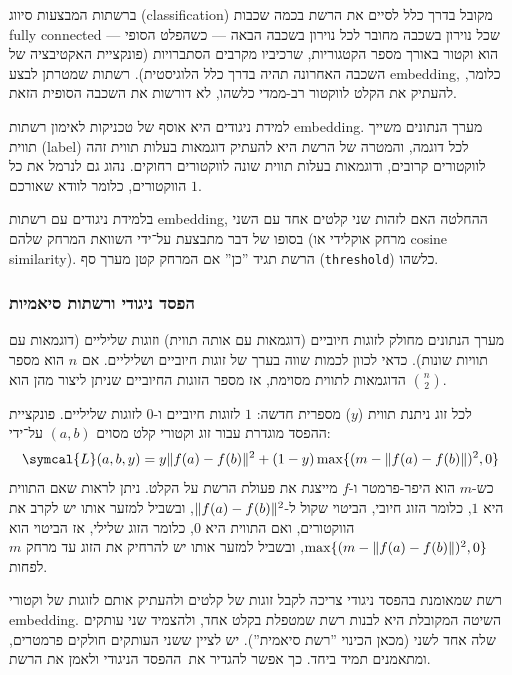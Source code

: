 \documentclass[hebrew, a4paper]{article}
\theoremstyle{plain}
\theoremstyle{definition}
\numberwithin{equation}{section}
\DeclarePairedDelimiter\norm{\lVert}{\rVert}
\DeclarePairedDelimiter\set{\{}{\}}
\begin{document}
ברשתות המבצעות סיווג (classification) מקובל בדרך כלל לסיים את הרשת
בכמה שכבות fully connected --- שכל נוירון בשכבה מחובר לכל נוירון בשכבה
הבאה --- כשהפלט הסופי הוא וקטור באורך מספר הקטגוריות, שרכיביו מקרבים
הסתברויות (פונקציית האקטיבציה של השכבה האחרונה תהיה בדרך כלל
הלוגיסטית). רשתות שמטרתן לבצע embedding, כלומר, להעתיק את הקלט לווקטור
רב-ממדי כלשהו, לא דורשות את השכבה הסופית הזאת.

למידת ניגודים היא אוסף של טכניקות לאימון רשתות embedding. מערך הנתונים
משייך תווית (label) לכל דוגמה, והמטרה של הרשת היא להעתיק דוגמאות בעלות
תווית זהה לווקטורים קרובים, ודוגמאות בעלות תווית שונה לווקטורים
רחוקים. נהוג גם לנרמל את כל הווקטורים, כלומר לוודא שאורכם $1$.

בלמידת ניגודים עם רשתות embedding, ההחלטה האם לזהות שני קלטים אחד עם
השני בסופו של דבר מתבצעת על־ידי השוואת המרחק שלהם (מרחק אוקלידי או
cosine similarity). הרשת תגיד ”כן” אם המרחק קטן מערך סף
(\verb|threshold|) כלשהו.

\subsubsection{הפסד ניגודי ורשתות סיאמיות}
\label{sec:contrastive-loss}

מערך הנתונים מחולק לזוגות חיוביים (דוגמאות עם אותה תווית) וזוגות
שליליים (דוגמאות עם תוויות שונות). כדאי לכוון לכמות שווה בערך של זוגות
חיוביים ושליליים. אם $n$ הוא מספר הדוגמאות לתווית מסוימת, אז מספר
הזוגות החיוביים שניתן ליצור מהן הוא $\binom{n}{2}$.

לכל זוג ניתנת תווית ($y$) מספרית חדשה: $1$ לזוגות חיוביים ו-$0$ לזוגות
שליליים. פונקציית ההפסד מוגדרת עבור זוג וקטורי קלט מסוים $(a,b)$
על־ידי:
\begin{equation}
  \label{eq:contrastive-loss}
  \symcal{L}(a,b,y) = y\norm{f(a) - f(b)}^2 + (1-y)\max\set{(m - \norm{f(a)-f(b)})^2, 0}
\end{equation}
כש-$m$ הוא היפר-פרמטר ו-$f$ מייצגת את פעולת הרשת על הקלט. ניתן לראות
שאם התווית היא $1$, כלומר הזוג חיובי, הביטוי שקול
ל-$\norm{f(a)-f(b)}^2$, ובשביל למזער אותו יש לקרב את הווקטורים, ואם
התווית היא $0$, כלומר הזוג שלילי, אז הביטוי הוא
$\max\set{(m-\norm{f(a)-f(b)})^2,0}$, ובשביל למזער אותו יש להרחיק את
הזוג עד מרחק $m$ לפחות.

רשת שמאומנת בהפסד ניגודי צריכה לקבל זוגות של קלטים ולהעתיק אותם לזוגות
של וקטורי embedding. השיטה המקובלת היא לבנות רשת שמטפלת בקלט אחד,
ולהצמיד שני עותקים שלה אחד לשני (מכאן הכינוי ”רשת סיאמית”). יש לציין
ששני העותקים חולקים פרמטרים, ומתאמנים תמיד ביחד. כך אפשר להגדיר
את~ההפסד הניגודי ולאמן את הרשת.
\end{document}
